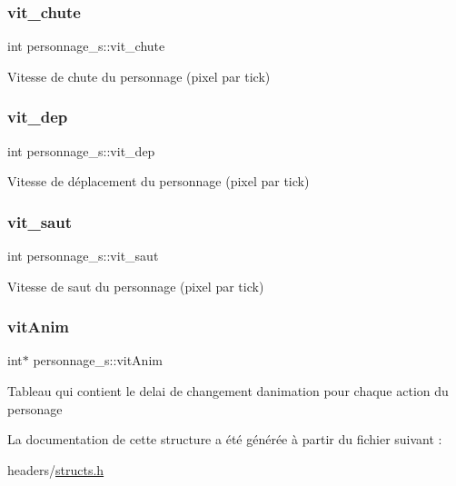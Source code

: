 \subsubsection{\texorpdfstring{vit\+\_\+chute}{vit\_chute}}
{\footnotesize\ttfamily int personnage\+\_\+s\+::vit\+\_\+chute}

Vitesse de chute du personnage (pixel par tick) \mbox{\label{structpersonnage__s_a6899a0efdc3a3fccb060aaf06b4e4b8d}} 
\subsubsection{\texorpdfstring{vit\+\_\+dep}{vit\_dep}}
{\footnotesize\ttfamily int personnage\+\_\+s\+::vit\+\_\+dep}

Vitesse de déplacement du personnage (pixel par tick) \mbox{\label{structpersonnage__s_abf199b160e1ce327b7def1ed1ee00b39}} 
\subsubsection{\texorpdfstring{vit\+\_\+saut}{vit\_saut}}
{\footnotesize\ttfamily int personnage\+\_\+s\+::vit\+\_\+saut}

Vitesse de saut du personnage (pixel par tick) \mbox{\label{structpersonnage__s_af44ce58e7c6ca78f9ceff803bb8bb931}} 
\subsubsection{\texorpdfstring{vit\+Anim}{vitAnim}}
{\footnotesize\ttfamily int$\ast$ personnage\+\_\+s\+::vit\+Anim}

Tableau qui contient le delai de changement d\textquotesingle{}animation pour chaque action du personage 

La documentation de cette structure a été générée à partir du fichier suivant \+:\begin{DoxyCompactItemize}
\item 
headers/\hyperlink{structs_8h}{structs.\+h}\end{DoxyCompactItemize}
